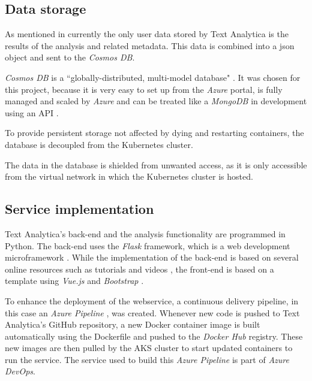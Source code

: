 \documentclass[conference]{IEEEtran}
\begin{document}
\subsection{Data storage}
As mentioned in  currently the only user data stored by Text Analytica is the results of the analysis and related metadata. This data is combined into a json object and sent to the \textit{Cosmos DB}.

\textit{Cosmos DB} is a ``globally-distributed, multi-model database" \cite{CosmosDB}. It was chosen for this project, because it is very easy to set up from the \textit{Azure} portal, is fully managed and scaled by \textit{Azure} and can be treated like a \textit{MongoDB} in development using an API \cite{CosmosMongoDB}.

To provide persistent storage not affected by dying and restarting containers, the database is decoupled from the Kubernetes cluster.

The data in the database is shielded from unwanted access, as it is only accessible from the virtual network in which the Kubernetes cluster is hosted.

\subsection{Service implementation}
Text Analytica's back-end and the analysis functionality are programmed in Python. The back-end uses the \textit{Flask} framework, which is a web development microframework \cite{Flask}. While the implementation of the back-end is based on several online resources such as tutorials and videos \cite{FlaskOnKubernetes, FlaskVue, FlaskMongo}, the front-end is based on a template using \textit{Vue.js} and \textit{Bootstrap} \cite{Bootstrap}.

To enhance the deployment of the webservice, a continuous delivery pipeline, in this case an \textit{Azure Pipeline} \cite{AzurePipeline}, was created. Whenever new code is pushed to Text Analytica's GitHub repository, a new Docker container image is built automatically using the Dockerfile and pushed to the \textit{Docker Hub} registry. These new images are then pulled by the AKS cluster to start updated containers to run the service. The service used to build this \textit{Azure Pipeline} is part of \textit{Azure DevOps}.
\end{document}
